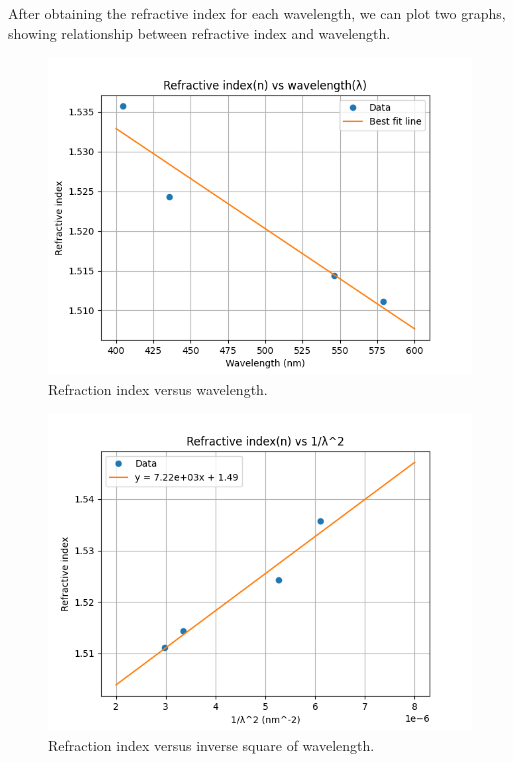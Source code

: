 \documentclass[10pt]{article}
\begin{document}
After obtaining the refractive index for each wavelength, we can plot two graphs, showing relationship between refractive index and wavelength.

\begin{figure}[ht]
    \centering
    \includegraphics[scale=0.6]{figures/f2.png}
    \caption{Refraction index versus wavelength.}
    \label{fig:2}
\end{figure}

\begin{figure}[ht]
    \centering
    \includegraphics[scale=0.6]{figures/f3.png}
    \caption{Refraction index versus inverse square of wavelength.}
    \label{fig:3}
\end{figure}
\end{document}
